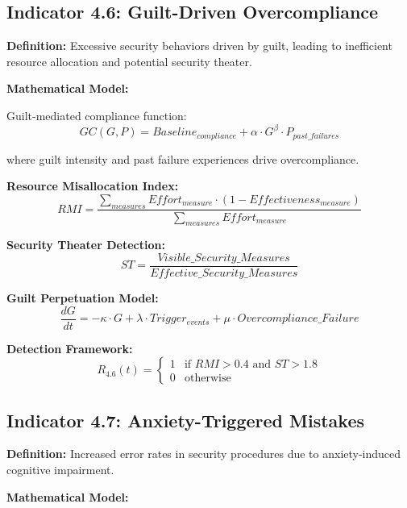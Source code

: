 \documentclass[11pt,a4paper]{article}
\begin{document}
\subsection{Indicator 4.6: Guilt-Driven Overcompliance}

\textbf{Definition:} Excessive security behaviors driven by guilt, leading to inefficient resource allocation and potential security theater.

\textbf{Mathematical Model:}

Guilt-mediated compliance function:
\begin{equation}
GC(G,P) = Baseline_{compliance} + \alpha \cdot G^{\beta} \cdot P_{past\_failures}
\end{equation}

where guilt intensity and past failure experiences drive overcompliance.

\textbf{Resource Misallocation Index:}
\begin{equation}
RMI = \frac{\sum_{measures} Effort_{measure} \cdot (1 - Effectiveness_{measure})}{\sum_{measures} Effort_{measure}}
\end{equation}

\textbf{Security Theater Detection:}
\begin{equation}
ST = \frac{Visible\_Security\_Measures}{Effective\_Security\_Measures}
\end{equation}

\textbf{Guilt Perpetuation Model:}
\begin{equation}
\frac{dG}{dt} = -\kappa \cdot G + \lambda \cdot Trigger_{events} + \mu \cdot Overcompliance\_Failure
\end{equation}

\textbf{Detection Framework:}
\begin{equation}
R_{4.6}(t) = \begin{cases}
1 & \text{if } RMI > 0.4 \text{ and } ST > 1.8 \\
0 & \text{otherwise}
\end{cases}
\end{equation}

\subsection{Indicator 4.7: Anxiety-Triggered Mistakes}

\textbf{Definition:} Increased error rates in security procedures due to anxiety-induced cognitive impairment.

\textbf{Mathematical Model:}
\end{document}
